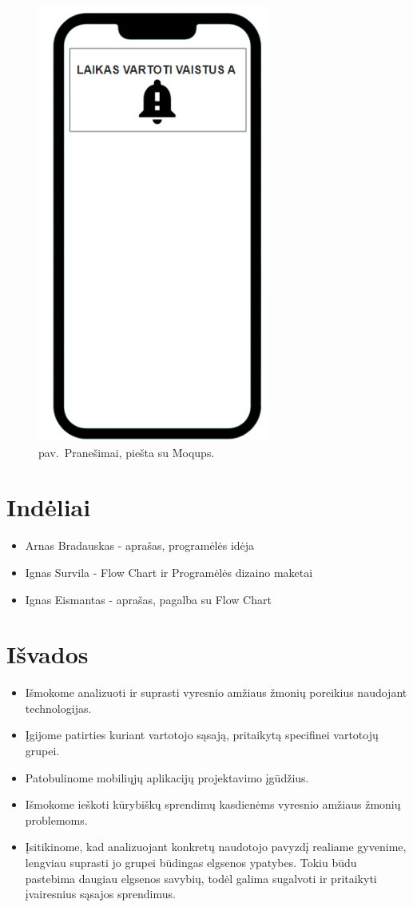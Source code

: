 \documentclass[14pt]{extarticle}
\renewcommand{\thefigure}{\arabic{figure} pav.}
\begin{document}
\begin{figure}[!htbp]
	\centering
	\includegraphics[width=3in]{images/notification.png}
	\caption{\thefigure\ Pranešimai, piešta su Moqups.}
\end{figure}

\clearpage

\section{Indėliai}
\begin{itemize}
	\item Arnas Bradauskas - aprašas, programėlės idėja
	\item Ignas Survila - Flow Chart ir Programėlės dizaino maketai
	\item Ignas Eismantas - aprašas, pagalba su Flow Chart
\end{itemize}

\section{Išvados}

\begin{itemize}
	\item Išmokome analizuoti ir suprasti vyresnio amžiaus žmonių poreikius naudojant technologijas.
	\item Įgijome patirties kuriant vartotojo sąsają, pritaikytą specifinei vartotojų grupei.
	\item Patobulinome mobiliųjų aplikacijų projektavimo įgūdžius.
	\item Išmokome ieškoti kūrybiškų sprendimų kasdienėms vyresnio amžiaus žmonių problemoms.
	\item Įsitikinome, kad analizuojant konkretų naudotojo pavyzdį realiame gyvenime, lengviau suprasti jo grupei būdingas elgsenos ypatybes. Tokiu būdu pastebima daugiau elgsenos savybių, todėl galima sugalvoti ir pritaikyti įvairesnius sąsajos sprendimus.
\end{itemize}
\end{document}
